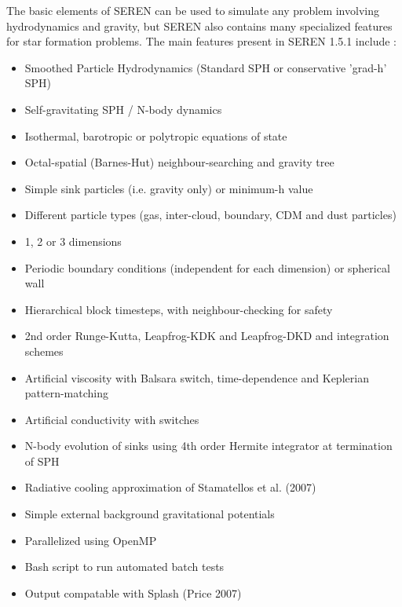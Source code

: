 \documentclass[a4paper]{article}
\newcommand{\NAME}{SEREN }
\newcommand{\VERNO}{1.5.1 }
\begin{document}
The basic elements of \NAME can be used to simulate any problem involving hydrodynamics and gravity, but \NAME also contains many specialized features for star formation problems.  The main features present in \NAME \VERNO  include : 
\begin{itemize}
\item Smoothed Particle Hydrodynamics (Standard SPH or conservative 'grad-h' SPH)
\item Self-gravitating SPH / N-body dynamics
\item Isothermal, barotropic or polytropic equations of state
\item Octal-spatial (Barnes-Hut) neighbour-searching and gravity tree
\item Simple sink particles (i.e. gravity only) or minimum-h value
\item Different particle types (gas, inter-cloud, boundary, CDM and dust particles)
\item 1, 2 or 3 dimensions
\item Periodic boundary conditions (independent for each dimension) or spherical wall
\item Hierarchical block timesteps, with neighbour-checking for safety
\item 2nd order Runge-Kutta, Leapfrog-KDK and Leapfrog-DKD and integration schemes
\item Artificial viscosity with Balsara switch, time-dependence and Keplerian pattern-matching
\item Artificial conductivity with switches
\item N-body evolution of sinks using 4th order Hermite integrator at termination of SPH
\item Radiative cooling approximation of Stamatellos et al. (2007)
\item Simple external background gravitational potentials
\item Parallelized using OpenMP
\item Bash script to run automated batch tests
\item Output compatable with Splash (Price 2007)
\end{itemize}
\end{document}
